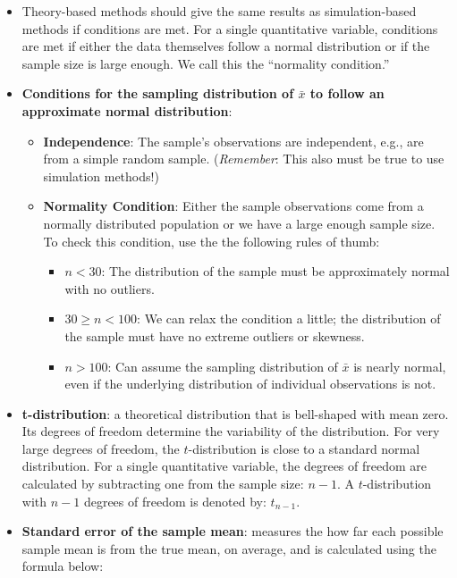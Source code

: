 \documentclass[
]{report}
\begin{document}
\begin{itemize}
\item
  Theory-based methods should give the same results as simulation-based methods if conditions are met. For a single quantitative variable, conditions are met if either the data themselves follow a normal distribution or if the sample size is large enough. We call this the ``normality condition.''
\item
  \textbf{Conditions for the sampling distribution of \(\bar{x}\) to follow an approximate normal distribution}:

  \begin{itemize}
  \item
    \textbf{Independence}: The sample's observations are independent, e.g., are from a simple random sample. (\emph{Remember}: This also must be true to use simulation methods!)
  \item
    \textbf{Normality Condition}: Either the sample observations come from a normally distributed population or we have a large enough sample size. To check this condition, use the the following rules of thumb:

    \begin{itemize}
    \item
      \(n < 30\): The distribution of the sample must be approximately normal with no outliers.
    \item
      \(30 \ge n < 100\): We can relax the condition a little; the distribution of the sample must have no extreme outliers or skewness.
    \item
      \(n > 100\): Can assume the sampling distribution of \(\bar{x}\) is nearly normal, even if the underlying distribution of individual observations is not.
    \end{itemize}
  \end{itemize}
\item
  \textbf{t-distribution}: a theoretical distribution that is bell-shaped with mean zero. Its degrees of freedom determine the variability of the distribution. For very large degrees of freedom, the \(t\)-distribution is close to a standard normal distribution. For a single quantitative variable, the degrees of freedom are calculated by subtracting one from the sample size: \(n-1\). A \(t\)-distribution with \(n-1\) degrees of freedom is denoted by: \(t_{n-1}\).
\item
  \textbf{Standard error of the sample mean}: measures the how far each possible sample mean is from the true mean, on average, and is calculated using the formula below:
\end{itemize}
\end{document}
